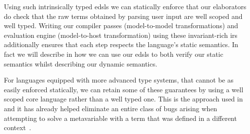 
\noindent
Using such intrinsically typed \acp{edsl} we can statically enforce that
our elaborators do check that the raw terms obtained by parsing user input
are well scoped and well typed.
%
Writing our compiler passes (model-to-model transformations) and
evaluation engine (model-to-host transformation) using these
invariant-rich \acp{ir} additionally ensures that each step respects
the language's static semantics.
%
In fact we will describe in  how we can use our \acp{edsl}
to both verify our static semantics whilst describing our dynamic semantics.

For languages equipped with more advanced type systems, that cannot be as easily
enforced statically, we can retain some of these guarantees by using a well
scoped core language rather than a well typed one.
%
This is the approach used in \Idris{} and it has already helped eliminate an
entire class of bugs arising when attempting to solve a metavariable with a
term that was defined in a different context~\cite{DBLP:conf/ecoop/Brady21}.
